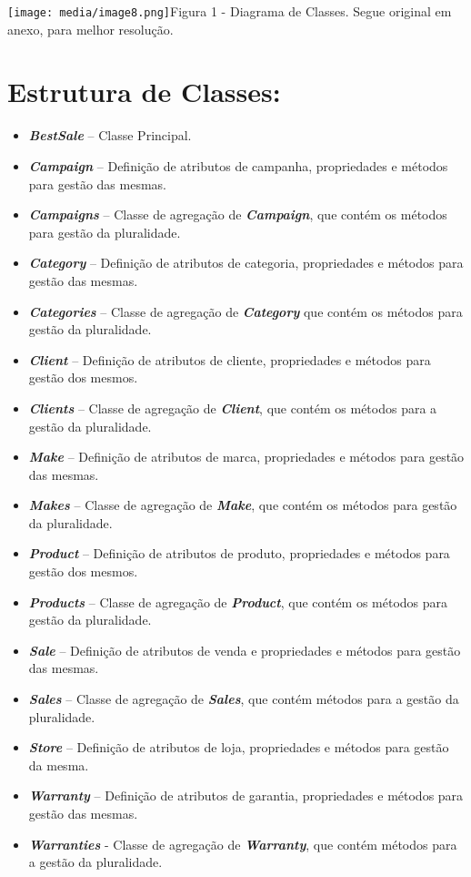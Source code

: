 \documentclass[
]{article}
\begin{document}
\texttt{[image: media/image8.png]}Figura
1 - Diagrama de Classes. Segue original em anexo, para melhor resolução.

\hypertarget{estrutura-de-classes}{%
\section{Estrutura de Classes:}\label{estrutura-de-classes}}

\begin{itemize}
\item
  \emph{\textbf{BestSale}} -- Classe Principal.
\item
  \emph{\textbf{Campaign}} -- Definição de atributos de campanha,
  propriedades e métodos para gestão das mesmas.
\item
  \emph{\textbf{Campaigns}} -- Classe de agregação de
  \emph{\textbf{Campaign}}, que contém os métodos para gestão da
  pluralidade.
\item
  \emph{\textbf{Category}} -- Definição de atributos de categoria,
  propriedades e métodos para gestão das mesmas.
\item
  \emph{\textbf{Categories}} -- Classe de agregação de
  \emph{\textbf{Category}} que contém os métodos para gestão da
  pluralidade.
\item
  \emph{\textbf{Client}} -- Definição de atributos de cliente,
  propriedades e métodos para gestão dos mesmos.
\item
  \emph{\textbf{Clients}} -- Classe de agregação de
  \emph{\textbf{Client}}, que contém os métodos para a gestão da
  pluralidade.
\item
  \emph{\textbf{Make}} -- Definição de atributos de marca, propriedades
  e métodos para gestão das mesmas.
\item
  \emph{\textbf{Makes}} -- Classe de agregação de \emph{\textbf{Make}},
  que contém os métodos para gestão da pluralidade.
\item
  \emph{\textbf{Product}} -- Definição de atributos de produto,
  propriedades e métodos para gestão dos mesmos.
\item
  \emph{\textbf{Products}} -- Classe de agregação de
  \emph{\textbf{Product}}, que contém os métodos para gestão da
  pluralidade.
\item
  \emph{\textbf{Sale}} -- Definição de atributos de venda e propriedades
  e métodos para gestão das mesmas.
\item
  \emph{\textbf{Sales}} -- Classe de agregação de \emph{\textbf{Sales}},
  que contém métodos para a gestão da pluralidade.
\item
  \emph{\textbf{Store}} -- Definição de atributos de loja, propriedades
  e métodos para gestão da mesma.
\item
  \emph{\textbf{Warranty}} -- Definição de atributos de garantia,
  propriedades e métodos para gestão das mesmas.
\item
  \emph{\textbf{Warranties}} - Classe de agregação de
  \emph{\textbf{Warranty}}, que contém métodos para a gestão da
  pluralidade.
\end{itemize}
\end{document}
